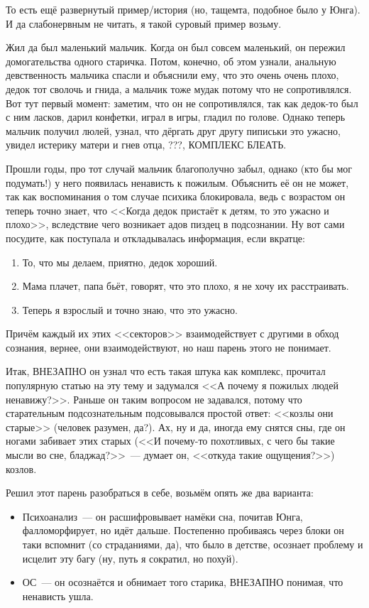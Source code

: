 \documentclass[a4paper,14pt,oneside]{memoir}
\begin{document}
То есть ещё развернутый пример/история (но, тащемта, подобное было у Юнга). И да слабонервным не читать, я такой суровый пример возьму. 

Жил да был маленький мальчик. Когда он был совсем маленький, он пережил домогательства одного старичка. Потом, конечно, об этом узнали, анальную девственность мальчика спасли и объяснили ему, что это очень очень плохо, дедок тот сволочь и гнида, а мальчик тоже мудак потому что не сопротивлялся. Вот тут первый момент: заметим, что он не сопротивлялся, так как дедок-то был с ним ласков, дарил конфетки, играл в игры, гладил по голове. Однако теперь мальчик получил люлей, узнал, что дёргать друг другу пиписьки это ужасно, увидел истерику матери и гнев отца, ???, КОМПЛЕКС БЛЕАТЬ.
 
Прошли годы, про тот случай мальчик благополучно забыл, однако (кто бы мог подумать!) у него появилась ненависть к пожилым. Объяснить её он не может, так как воспоминания о том случае психика блокировала, ведь с возрастом он теперь точно знает, что <<Когда дедок пристаёт к детям, то это ужасно и плохо>>, вследствие чего возникает адов пиздец в подсознании. Ну вот сами посудите, как поступала и откладывалась информация, если вкратце:
\begin{enumerate}
\item То, что мы делаем, приятно, дедок хороший.
\item Мама плачет, папа бьёт, говорят, что это плохо, я не хочу их расстраивать.
\item Теперь я взрослый и точно знаю, что это ужасно. 
\end{enumerate}

Причём каждый их этих <<секторов>> взаимодействует с другими в обход сознания, вернее, они взаимодействуют, но наш парень этого не понимает.
 
Итак, ВНЕЗАПНО он узнал что есть такая штука как комплекс, прочитал популярную статью на эту тему и задумался <<А почему я пожилых людей ненавижу?>>. Раньше он таким вопросом не задавался, потому что старательным подсознательным подсовывался простой ответ: <<козлы они старые>> (человек разумен, да?). Ах, ну и да, иногда ему снятся сны, где он ногами забивает этих старых (<<И почему-то похотливых, с чего бы такие мысли во сне, бладжад?>>~--- думает он, <<откуда такие ощущения?>>) козлов. 

Решил этот парень разобраться в себе, возьмём опять же два варианта:
\begin{itemize} 
\item Психоанализ~--- он расшифровывает намёки сна, почитав Юнга, фалломорфирует, но идёт дальше. Постепенно пробиваясь через блоки он таки вспомнит (со страданиями, да), что было в детстве, осознает проблему и исцелит эту багу (ну, путь я сократил, но похуй).
\item ОС~--- он осознаётся и обнимает того старика, ВНЕЗАПНО понимая, что ненависть ушла.
\end{itemize}
\end{document}

